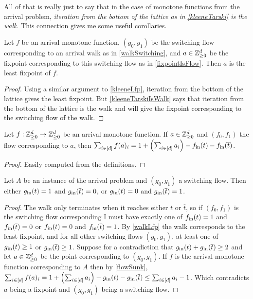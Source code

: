   All of that is really just to say that in the case of monotone functions from the arrival problem,
  \emph{iteration from the bottom of the lattice as in \cref{kleeneTarski} is the walk}. This connection gives
  me some useful corollaries.
  \begin{cor}\label{walkLfp}
    Let $f$ be an arrival monotone function, 
    $(g_0, g_1)$ be the switching flow corresponding to an arrival walk as in \cref{walkSwitching},
    and $a \in \mathbb{Z}_{\geq 0}^d$ be the fixpoint corresponding to this switching flow as in \cref{fixpointIsFlow}.
    Then $a$ is the least fixpoint of $f$.
  \end{cor}
  \begin{proof}
    Using a similar argument to \cref{kleeneLfp}, iteration from the bottom of the lattice gives the least
    fixpoint. But \cref{kleeneTarskiIsWalk} says that iteration from the bottom of the lattice is the walk
    and will give the fixpoint corresponding to the switching flow of the walk.
  \end{proof}
  \begin{lemma} \label{flowSunk}
    Let $f : \mathbb{Z}_{\geq 0}^d \to \mathbb{Z}_{\geq 0}^d$ be an arrival monotone function. If $a \in \mathbb{Z}_{\geq 0}^d$ and
    $(f_0, f_1)$ the flow corresponding to $a$, then 
    $\sum_{i \in [d]} f(a)_i =  1 + \left( \sum_{i \in [d]} a_i \right) - f_{\text{in}}(t) - f_{\text{in}}(\overline{t})$.
  \end{lemma}
  \begin{proof}
    Easily computed from the definitions.
  \end{proof}
  \begin{cor}
    Let $A$ be an instance of the arrival problem and $(g_0, g_1)$ a switching flow.
    Then either $g_{\text{in}} (t) = 1$ and $g_{\text{in}} (\overline{t}) = 0$,
    or $g_{\text{in}} (t) = 0$ and $g_{\text{in}} (\overline{t}) = 1$.
  \end{cor}
  \begin{proof}
    The walk only terminates when it reaches either $t$ or $\overline{t}$, so if $(f_0, f_1)$ 
    is the switching flow corresponding
    I must have exactly one of $f_{\text{in}}(t) = 1$ and $f_{\text{in}}(\overline{t}) = 0$ or 
    $f_{\text{in}}(t) = 0$ and $f_{\text{in}}(\overline{t}) = 1$. By \cref{walkLfp} the walk corresponds
    to the least fixpoint, and for all other switching flows $(g_0, g_1)$, at least one of $g_{\text{in}} (t) \geq 1$ or
    $g_{\text{in}} (\overline{t}) \geq 1$. Suppose for a contradiction that $g_{\text{in}} (t) + g_{\text{in}} (\overline{t}) \geq 2$ and let
    $a \in \mathbb{Z}_{\geq 0}^d$ be the point corresponding to $(g_0, g_1)$. If $f$ is the arrival monotone function corresponding to $A$ then by \cref{flowSunk},
      $\sum_{i \in [d]} f(a)_i = 1 + \left( \sum_{i \in [d]} a_i\right) 
        - g_{\text{in}}(t) - g_{\text{in}}(\overline{t})
                              \leq \sum_{i \in [d]} a_i - 1$.
    Which contradicts $a$ being a fixpoint and $(g_0, g_1)$ being a switching flow.
  \end{proof}
